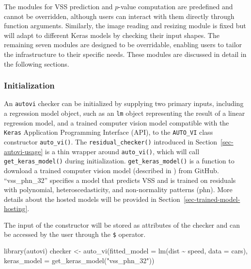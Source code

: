 \documentclass[
doublespace,
  times]{anzsauth}
\newenvironment{Shaded}{\begin{snugshade}}{\end{snugshade}}
\newcommand{\AttributeTok}[1]{\textcolor[rgb]{0.40,0.45,0.13}{#1}}
\newcommand{\FunctionTok}[1]{\textcolor[rgb]{0.28,0.35,0.67}{#1}}
\newcommand{\NormalTok}[1]{\textcolor[rgb]{0.00,0.23,0.31}{#1}}
\newcommand{\OtherTok}[1]{\textcolor[rgb]{0.00,0.23,0.31}{#1}}
\newcommand{\SpecialCharTok}[1]{\textcolor[rgb]{0.37,0.37,0.37}{#1}}
\newcommand{\StringTok}[1]{\textcolor[rgb]{0.13,0.47,0.30}{#1}}
\begin{document}
The modules for VSS prediction and \(p\)-value computation are
predefined and cannot be overridden, although users can interact with
them directly through function arguments. Similarly, the image reading
and resizing module is fixed but will adapt to different Keras models by
checking their input shapes. The remaining seven modules are designed to
be overridable, enabling users to tailor the infrastructure to their
specific needs. These modules are discussed in detail in the following
sections.

\subsubsection{Initialization}\label{initialization}

An \texttt{autovi} checker can be initialized by supplying two primary
inputs, including a regression model object, such as an \texttt{lm}
object representing the result of a linear regression model, and a
trained computer vision model compatible with the \texttt{Keras}
\citep{chollet2015keras} Application Programming Interface (API), to the
\texttt{AUTO\_VI} class constructor \texttt{auto\_vi()}. The
\texttt{residual\_checker()} introduced in
Section~\ref{sec-autovi-usage} is a thin wrapper around
\texttt{auto\_vi()}, which will call \texttt{get\_keras\_model()} during
initialization. \texttt{get\_keras\_model()} is a function to download a
trained computer vision model (described in \citet{li2024automated})
from GitHub. ``vss\_phn\_32'' specifies a model that predicts VSS and is
trained on residuals with polynomial, heteroscedasticity, and
non-normality patterns (phn). More details about the hosted models will
be provided in Section~\ref{sec-trained-model-hosting}.

The input of the constructor will be stored as attributes of the checker
and can be accessed by the user through the \texttt{\$} operator.

\begin{Shaded}
\begin{Highlighting}[]
\FunctionTok{library}\NormalTok{(autovi)}
\NormalTok{checker }\OtherTok{\textless{}{-}} \FunctionTok{auto\_vi}\NormalTok{(}\AttributeTok{fitted\_model =} \FunctionTok{lm}\NormalTok{(dist }\SpecialCharTok{\textasciitilde{}}\NormalTok{ speed, }\AttributeTok{data =}\NormalTok{ cars), }
                   \AttributeTok{keras\_model =} \FunctionTok{get\_keras\_model}\NormalTok{(}\StringTok{"vss\_phn\_32"}\NormalTok{))}
\end{Highlighting}
\end{Shaded}
\end{document}
